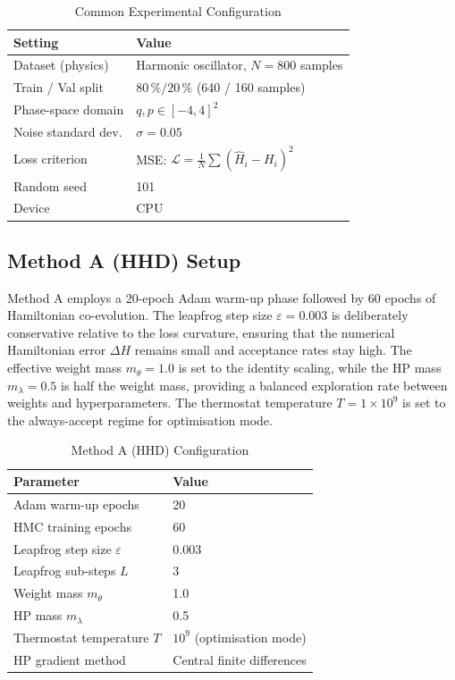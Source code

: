 \documentclass[11pt]{article}
\begin{document}
\begin{table}[H]
\centering
\caption{Common Experimental Configuration}
\label{tab:common_setup}
\renewcommand{\arraystretch}{1.2}
\begin{tabular}{ll}
\toprule
Setting & Value \\
\midrule
Dataset (physics)    & Harmonic oscillator, $N = 800$ samples \\
Train / Val split    & $80\,\% / 20\,\%$ (640 / 160 samples) \\
Phase-space domain   & $q, p \in [-4, 4]^2$ \\
Noise standard dev.  & $\sigma = 0.05$ \\
Loss criterion       & MSE: $\mathcal{L} = \frac{1}{N}\sum(\hat{H}_i - H_i)^2$ \\
Random seed          & 101 \\
Device               & CPU \\
\bottomrule
\end{tabular}
\end{table}

\subsection{Method A (HHD) Setup}

Method A employs a 20-epoch Adam warm-up phase followed by 60 epochs
of Hamiltonian co-evolution.  The leapfrog step size $\varepsilon = 0.003$
is deliberately conservative relative to the loss curvature, ensuring
that the numerical Hamiltonian error $\Delta H$ remains small and
acceptance rates stay high.  The effective weight mass $m_\theta = 1.0$
is set to the identity scaling, while the HP mass $m_\lambda = 0.5$
is half the weight mass, providing a balanced exploration rate between
weights and hyperparameters.  The thermostat temperature $T = 1 \times 10^9$
is set to the always-accept regime for optimisation mode.

\begin{table}[H]
\centering
\caption{Method A (HHD) Configuration}
\label{tab:setup_a}
\renewcommand{\arraystretch}{1.2}
\begin{tabular}{ll}
\toprule
Parameter & Value \\
\midrule
Adam warm-up epochs             & 20 \\
HMC training epochs             & 60 \\
Leapfrog step size $\varepsilon$ & 0.003 \\
Leapfrog sub-steps $L$          & 3 \\
Weight mass $m_\theta$          & 1.0 \\
HP mass $m_\lambda$             & 0.5 \\
Thermostat temperature $T$      & $10^9$ (optimisation mode) \\
HP gradient method              & Central finite differences \\
\bottomrule
\end{tabular}
\end{table}
\end{document}
